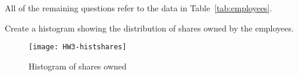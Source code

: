 \documentclass[11pt]{exam}
\begin{document}
\begin{questions}
All of the remaining questions refer to the data in
Table~\ref{tab:employees}.

  \question Create a histogram showing the distribution of shares owned by
  the employees.
\ifprintanswers
\begin{figure}
  \begin{center}
\texttt{[image: HW3-histshares]}
  \end{center}
  \caption{Histogram of shares owned}
  \label{fig:one}
\end{figure}
\fi

\end{questions}

\ifprintanswers
\begin{center} \gradetable[h][questions] \end{center}
\fi
\end{document}
